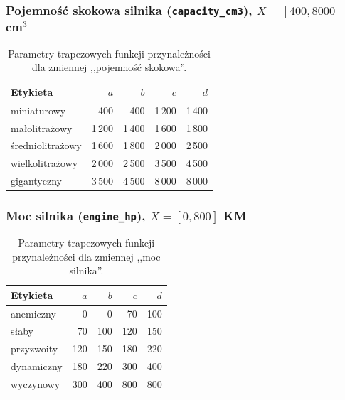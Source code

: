 \documentclass{article}
\begin{document}
\subsubsection{Pojemność skokowa silnika (\texttt{capacity\_cm3}), $X = [400, 8000]$ cm$^3$}
\begin{table}[H]
\centering
\caption{Parametry trapezowych funkcji przynależności dla zmiennej
,,pojemność skokowa''.}
\label{tab:mf-capacity}
\begin{tabular}{l r r r r}
\toprule
Etykieta & $a$ & $b$ & $c$ & $d$ \\
\midrule
miniaturowy        &   400 &   400 & 1\,200 & 1\,400 \\
małolitrażowy      & 1\,200 & 1\,400 & 1\,600 & 1\,800 \\
średniolitrażowy   & 1\,600 & 1\,800 & 2\,000 & 2\,500 \\
wielkolitrażowy    & 2\,000 & 2\,500 & 3\,500 & 4\,500 \\
gigantyczny        & 3\,500 & 4\,500 & 8\,000 & 8\,000 \\
\bottomrule
\end{tabular}
\end{table}

\subsubsection{Moc silnika (\texttt{engine\_hp}), $X = [0, 800]$ KM}
\begin{table}[H]
\centering
\caption{Parametry trapezowych funkcji przynależności dla zmiennej
,,moc silnika''.}
\label{tab:mf-hp}
\begin{tabular}{l r r r r}
\toprule
Etykieta & $a$ & $b$ & $c$ & $d$ \\
\midrule
anemiczny    &   0 &   0 &  70 & 100 \\
słaby        &  70 & 100 & 120 & 150 \\
przyzwoity   & 120 & 150 & 180 & 220 \\
dynamiczny   & 180 & 220 & 300 & 400 \\
wyczynowy    & 300 & 400 & 800 & 800 \\
\bottomrule
\end{tabular}
\end{table}
\end{document}
